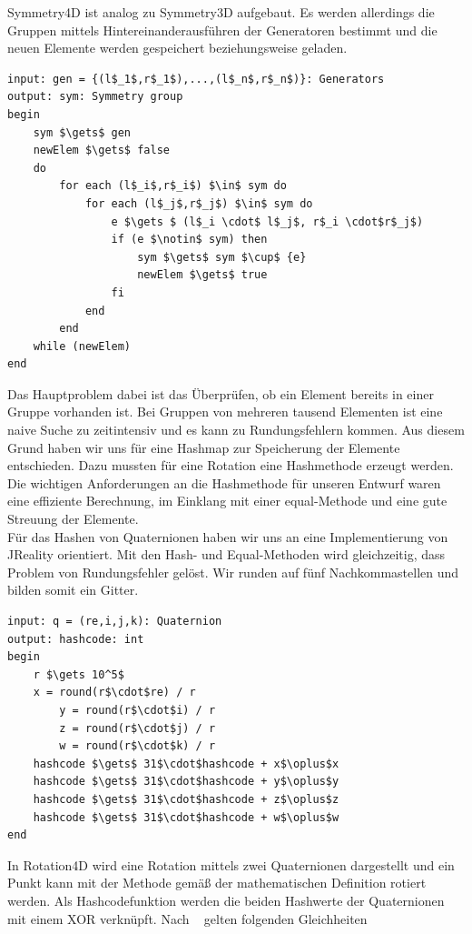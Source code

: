 Symmetry4D ist analog zu Symmetry3D aufgebaut. Es werden allerdings die Gruppen mittels Hintereinanderausführen der Generatoren bestimmt und die neuen Elemente werden gespeichert beziehungsweise geladen.
\begin{lstlisting}[mathescape, morekeywords={for, each, if, then, fi, do, begin,input, output, end, return}, caption={Peusdocode der Symmetriegruppeerzeugung}, label=alg:fromgen]
input: gen = {(l$_1$,r$_1$),...,(l$_n$,r$_n$)}: Generators
output: sym: Symmetry group
begin	
	sym $\gets$ gen
	newElem $\gets$ false
	do
		for each (l$_i$,r$_i$) $\in$ sym do
			for each (l$_j$,r$_j$) $\in$ sym do
				e $\gets $ (l$_i \cdot$ l$_j$, r$_i \cdot$r$_j$)
				if (e $\notin$ sym) then
					sym $\gets$ sym $\cup$ {e}
					newElem $\gets$ true
				fi
			end
		end
	while (newElem)
end 

\end{lstlisting}
Das Hauptproblem dabei ist das Überprüfen, ob ein Element bereits in einer Gruppe vorhanden ist. Bei Gruppen von mehreren tausend Elementen ist eine naive Suche zu zeitintensiv und es kann zu Rundungsfehlern kommen. Aus diesem Grund haben wir uns für eine Hashmap zur Speicherung der Elemente entschieden. Dazu mussten für eine Rotation eine Hashmethode erzeugt werden. Die wichtigen Anforderungen an die Hashmethode für unseren Entwurf waren eine effiziente Berechnung, im Einklang mit einer equal-Methode und eine gute Streuung der Elemente.\\
Für das Hashen von Quaternionen haben wir uns an eine Implementierung von JReality orientiert. Mit den Hash- und Equal-Methoden wird gleichzeitig, dass Problem von Rundungsfehler gelöst. Wir runden auf fünf Nachkommastellen und bilden somit ein Gitter. 
\begin{lstlisting}[mathescape, morekeywords={for, each, if, then, fi, do, begin,input, output, end, return}, caption={Peusdocode der Erzeugung von Hashcode eines Quaternions}, label=alg:hash]
input: q = (re,i,j,k): Quaternion
output: hashcode: int
begin	
	r $\gets 10^5$
	x = round(r$\cdot$re) / r
    	y = round(r$\cdot$i) / r
    	z = round(r$\cdot$j) / r
    	w = round(r$\cdot$k) / r
	hashcode $\gets$ 31$\cdot$hashcode + x$\oplus$x
	hashcode $\gets$ 31$\cdot$hashcode + y$\oplus$y
	hashcode $\gets$ 31$\cdot$hashcode + z$\oplus$z
	hashcode $\gets$ 31$\cdot$hashcode + w$\oplus$w
end 
\end{lstlisting}
In Rotation4D wird eine Rotation mittels zwei Quaternionen dargestellt und ein Punkt kann mit der Methode gemäß der mathematischen Definition rotiert werden. Als Hashcodefunktion werden die beiden Hashwerte der Quaternionen mit einem XOR verknüpft. Nach ~\cite{conway2003} gelten folgenden Gleichheiten
